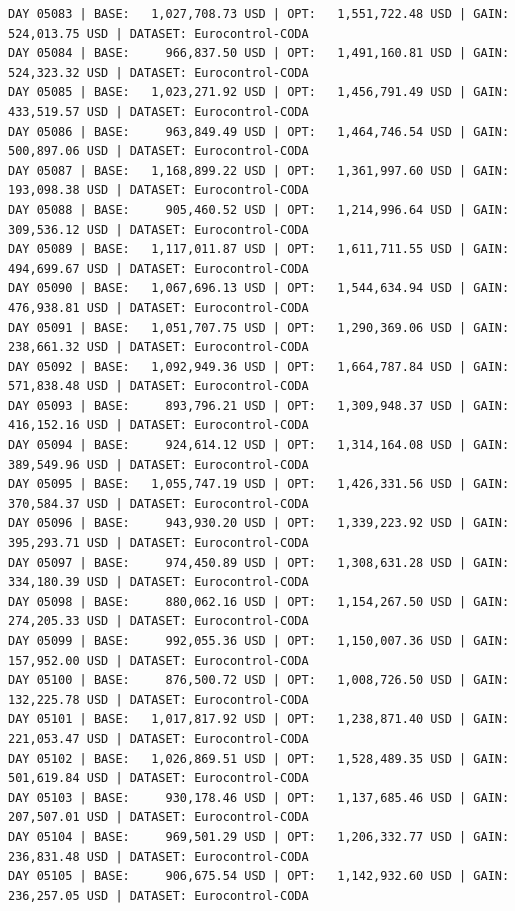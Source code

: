 \documentclass[11pt,a4paper]{article}
\begin{document}
\begin{verbatim}
DAY 05083 | BASE:   1,027,708.73 USD | OPT:   1,551,722.48 USD | GAIN: 524,013.75 USD | DATASET: Eurocontrol-CODA
DAY 05084 | BASE:     966,837.50 USD | OPT:   1,491,160.81 USD | GAIN: 524,323.32 USD | DATASET: Eurocontrol-CODA
DAY 05085 | BASE:   1,023,271.92 USD | OPT:   1,456,791.49 USD | GAIN: 433,519.57 USD | DATASET: Eurocontrol-CODA
DAY 05086 | BASE:     963,849.49 USD | OPT:   1,464,746.54 USD | GAIN: 500,897.06 USD | DATASET: Eurocontrol-CODA
DAY 05087 | BASE:   1,168,899.22 USD | OPT:   1,361,997.60 USD | GAIN: 193,098.38 USD | DATASET: Eurocontrol-CODA
DAY 05088 | BASE:     905,460.52 USD | OPT:   1,214,996.64 USD | GAIN: 309,536.12 USD | DATASET: Eurocontrol-CODA
DAY 05089 | BASE:   1,117,011.87 USD | OPT:   1,611,711.55 USD | GAIN: 494,699.67 USD | DATASET: Eurocontrol-CODA
DAY 05090 | BASE:   1,067,696.13 USD | OPT:   1,544,634.94 USD | GAIN: 476,938.81 USD | DATASET: Eurocontrol-CODA
DAY 05091 | BASE:   1,051,707.75 USD | OPT:   1,290,369.06 USD | GAIN: 238,661.32 USD | DATASET: Eurocontrol-CODA
DAY 05092 | BASE:   1,092,949.36 USD | OPT:   1,664,787.84 USD | GAIN: 571,838.48 USD | DATASET: Eurocontrol-CODA
DAY 05093 | BASE:     893,796.21 USD | OPT:   1,309,948.37 USD | GAIN: 416,152.16 USD | DATASET: Eurocontrol-CODA
DAY 05094 | BASE:     924,614.12 USD | OPT:   1,314,164.08 USD | GAIN: 389,549.96 USD | DATASET: Eurocontrol-CODA
DAY 05095 | BASE:   1,055,747.19 USD | OPT:   1,426,331.56 USD | GAIN: 370,584.37 USD | DATASET: Eurocontrol-CODA
DAY 05096 | BASE:     943,930.20 USD | OPT:   1,339,223.92 USD | GAIN: 395,293.71 USD | DATASET: Eurocontrol-CODA
DAY 05097 | BASE:     974,450.89 USD | OPT:   1,308,631.28 USD | GAIN: 334,180.39 USD | DATASET: Eurocontrol-CODA
DAY 05098 | BASE:     880,062.16 USD | OPT:   1,154,267.50 USD | GAIN: 274,205.33 USD | DATASET: Eurocontrol-CODA
DAY 05099 | BASE:     992,055.36 USD | OPT:   1,150,007.36 USD | GAIN: 157,952.00 USD | DATASET: Eurocontrol-CODA
DAY 05100 | BASE:     876,500.72 USD | OPT:   1,008,726.50 USD | GAIN: 132,225.78 USD | DATASET: Eurocontrol-CODA
DAY 05101 | BASE:   1,017,817.92 USD | OPT:   1,238,871.40 USD | GAIN: 221,053.47 USD | DATASET: Eurocontrol-CODA
DAY 05102 | BASE:   1,026,869.51 USD | OPT:   1,528,489.35 USD | GAIN: 501,619.84 USD | DATASET: Eurocontrol-CODA
DAY 05103 | BASE:     930,178.46 USD | OPT:   1,137,685.46 USD | GAIN: 207,507.01 USD | DATASET: Eurocontrol-CODA
DAY 05104 | BASE:     969,501.29 USD | OPT:   1,206,332.77 USD | GAIN: 236,831.48 USD | DATASET: Eurocontrol-CODA
DAY 05105 | BASE:     906,675.54 USD | OPT:   1,142,932.60 USD | GAIN: 236,257.05 USD | DATASET: Eurocontrol-CODA

\end{verbatim}
\end{document}
